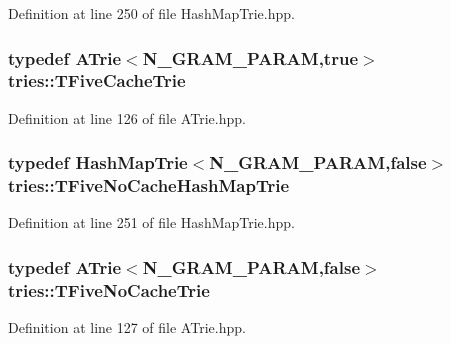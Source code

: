 Definition at line 250 of file Hash\+Map\+Trie.\+hpp.

\hypertarget{namespacetries_a8b71e593af4a9a80282f1fa85d7f8255}{}
\subsubsection[{T\+Five\+Cache\+Trie}]{\setlength{\rightskip}{0pt plus 5cm}typedef {\bf A\+Trie}$<${\bf N\+\_\+\+G\+R\+A\+M\+\_\+\+P\+A\+R\+A\+M},true$>$ {\bf tries\+::\+T\+Five\+Cache\+Trie}}\label{namespacetries_a8b71e593af4a9a80282f1fa85d7f8255}


Definition at line 126 of file A\+Trie.\+hpp.

\hypertarget{namespacetries_ae939879f99b16d403aacda01ec1adf42}{}
\subsubsection[{T\+Five\+No\+Cache\+Hash\+Map\+Trie}]{\setlength{\rightskip}{0pt plus 5cm}typedef {\bf Hash\+Map\+Trie}$<${\bf N\+\_\+\+G\+R\+A\+M\+\_\+\+P\+A\+R\+A\+M},false$>$ {\bf tries\+::\+T\+Five\+No\+Cache\+Hash\+Map\+Trie}}\label{namespacetries_ae939879f99b16d403aacda01ec1adf42}


Definition at line 251 of file Hash\+Map\+Trie.\+hpp.

\hypertarget{namespacetries_adc3f42d6b717a7d2a34ad0d90c028a00}{}
\subsubsection[{T\+Five\+No\+Cache\+Trie}]{\setlength{\rightskip}{0pt plus 5cm}typedef {\bf A\+Trie}$<${\bf N\+\_\+\+G\+R\+A\+M\+\_\+\+P\+A\+R\+A\+M},false$>$ {\bf tries\+::\+T\+Five\+No\+Cache\+Trie}}\label{namespacetries_adc3f42d6b717a7d2a34ad0d90c028a00}


Definition at line 127 of file A\+Trie.\+hpp.

\hypertarget{namespacetries_a3eaf32cf4423e228789e4387cd912d2a}{}
